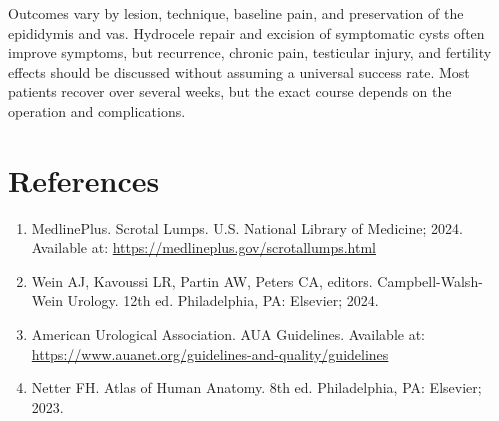 Outcomes vary by lesion, technique, baseline pain, and preservation of the epididymis and vas. Hydrocele repair and excision of symptomatic cysts often improve symptoms, but recurrence, chronic pain, testicular injury, and fertility effects should be discussed without assuming a universal success rate. Most patients recover over several weeks, but the exact course depends on the operation and complications.

\section*{References}
\begin{enumerate}
  \item MedlinePlus. Scrotal Lumps. U.S. National Library of Medicine; 2024. Available at: \url{https://medlineplus.gov/scrotallumps.html}
  \item Wein AJ, Kavoussi LR, Partin AW, Peters CA, editors. Campbell-Walsh-Wein Urology. 12th ed. Philadelphia, PA: Elsevier; 2024.
  \item American Urological Association. AUA Guidelines. Available at: \url{https://www.auanet.org/guidelines-and-quality/guidelines}
  \item Netter FH. Atlas of Human Anatomy. 8th ed. Philadelphia, PA: Elsevier; 2023.
\end{enumerate}

\clearpage
